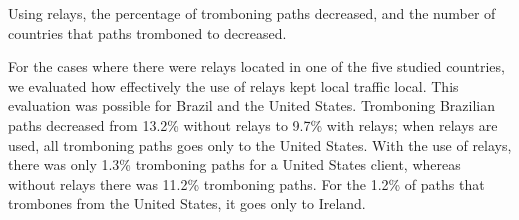 \begin{finding}
Using relays, the percentage of tromboning paths decreased, and the number of countries that paths tromboned to decreased.
\end{finding}
For the cases where there were relays located in one of the five studied countries, we evaluated how effectively the use of relays kept local traffic local.  This evaluation was possible for Brazil and the United States.  Tromboning Brazilian paths decreased from 13.2\% without relays to 9.7\% with relays; when relays are used, all tromboning paths goes only to the United States.  With the use of relays, there was only 1.3\% tromboning paths for a United States client, whereas without relays there was 11.2\% tromboning paths.  For the 1.2\% of paths that trombones from the United States, it goes only to Ireland.
